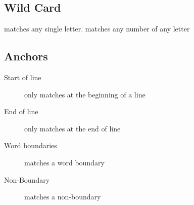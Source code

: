 \subsection{Wild Card}

   matches any single letter.  matches any number of any
  letter

\subsection{Anchors}

  \begin{description}
    \item[Start of line]  only matches  at the
    beginning of a line
    \item[End of line]  only matches  at the end of
    line
    \item[Word boundaries]  matches a word boundary
    \item[Non-Boundary]  matches a non-boundary
  \end{description}
